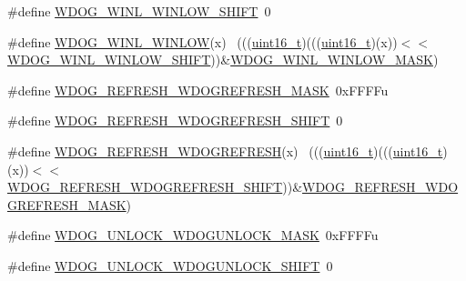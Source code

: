 \begin{DoxyCompactItemize}
\#define \hyperlink{group___w_d_o_g___register___masks_ga7f2baf848e4bfe9b0143d073467d1c1a}{W\+D\+O\+G\+\_\+\+W\+I\+N\+L\+\_\+\+W\+I\+N\+L\+O\+W\+\_\+\+S\+H\+I\+FT}~0
\item 
\#define \hyperlink{group___w_d_o_g___register___masks_ga7f530a06e58e70f3efd6955dfab8cec6}{W\+D\+O\+G\+\_\+\+W\+I\+N\+L\+\_\+\+W\+I\+N\+L\+OW}(x)                                        ~(((\hyperlink{_p_e___types_8h_a1f1825b69244eb3ad2c7165ddc99c956}{uint16\+\_\+t})(((\hyperlink{_p_e___types_8h_a1f1825b69244eb3ad2c7165ddc99c956}{uint16\+\_\+t})(x))$<$$<$\hyperlink{group___w_d_o_g___register___masks_ga7f2baf848e4bfe9b0143d073467d1c1a}{W\+D\+O\+G\+\_\+\+W\+I\+N\+L\+\_\+\+W\+I\+N\+L\+O\+W\+\_\+\+S\+H\+I\+FT}))\&\hyperlink{group___w_d_o_g___register___masks_gadc36bfdccd5e9c14d063a5b36b6a3f6a}{W\+D\+O\+G\+\_\+\+W\+I\+N\+L\+\_\+\+W\+I\+N\+L\+O\+W\+\_\+\+M\+A\+SK})
\item 
\#define \hyperlink{group___w_d_o_g___register___masks_ga59e560838a4c519b514c0def0d6034fa}{W\+D\+O\+G\+\_\+\+R\+E\+F\+R\+E\+S\+H\+\_\+\+W\+D\+O\+G\+R\+E\+F\+R\+E\+S\+H\+\_\+\+M\+A\+SK}~0x\+F\+F\+F\+Fu
\item 
\#define \hyperlink{group___w_d_o_g___register___masks_ga526acc27150ff67f1f026bdcc1bb364c}{W\+D\+O\+G\+\_\+\+R\+E\+F\+R\+E\+S\+H\+\_\+\+W\+D\+O\+G\+R\+E\+F\+R\+E\+S\+H\+\_\+\+S\+H\+I\+FT}~0
\item 
\#define \hyperlink{group___w_d_o_g___register___masks_gac8bddfffd653d08494c2379dd56190fd}{W\+D\+O\+G\+\_\+\+R\+E\+F\+R\+E\+S\+H\+\_\+\+W\+D\+O\+G\+R\+E\+F\+R\+E\+SH}(x)                        ~(((\hyperlink{_p_e___types_8h_a1f1825b69244eb3ad2c7165ddc99c956}{uint16\+\_\+t})(((\hyperlink{_p_e___types_8h_a1f1825b69244eb3ad2c7165ddc99c956}{uint16\+\_\+t})(x))$<$$<$\hyperlink{group___w_d_o_g___register___masks_ga526acc27150ff67f1f026bdcc1bb364c}{W\+D\+O\+G\+\_\+\+R\+E\+F\+R\+E\+S\+H\+\_\+\+W\+D\+O\+G\+R\+E\+F\+R\+E\+S\+H\+\_\+\+S\+H\+I\+FT}))\&\hyperlink{group___w_d_o_g___register___masks_ga59e560838a4c519b514c0def0d6034fa}{W\+D\+O\+G\+\_\+\+R\+E\+F\+R\+E\+S\+H\+\_\+\+W\+D\+O\+G\+R\+E\+F\+R\+E\+S\+H\+\_\+\+M\+A\+SK})
\item 
\#define \hyperlink{group___w_d_o_g___register___masks_gadcf9026f6f2730a765e504ec4c7126a8}{W\+D\+O\+G\+\_\+\+U\+N\+L\+O\+C\+K\+\_\+\+W\+D\+O\+G\+U\+N\+L\+O\+C\+K\+\_\+\+M\+A\+SK}~0x\+F\+F\+F\+Fu
\item 
\#define \hyperlink{group___w_d_o_g___register___masks_ga07ed92839744d67e4c393b00bc293246}{W\+D\+O\+G\+\_\+\+U\+N\+L\+O\+C\+K\+\_\+\+W\+D\+O\+G\+U\+N\+L\+O\+C\+K\+\_\+\+S\+H\+I\+FT}~0

\end{DoxyCompactItemize}
